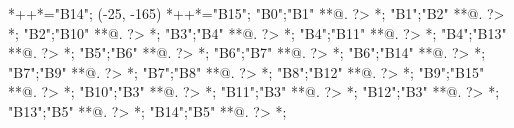 \begin{scriptsize}
	*++{}*\frm{-,}="B14";
(-25, -165)
	*++{}*\frm{-,}="B15";
"B0";"B1" **@{.} ?> *{\dir{>}};
"B1";"B2" **@{.} ?> *{\dir{>}};
"B2";"B10" **@{.} ?> *{\dir{>}};
"B3";"B4" **@{.} ?> *{\dir{>}};
"B4";"B11" **@{.} ?> *{\dir{>}};
"B4";"B13" **@{.} ?> *{\dir{>}};
"B5";"B6" **@{.} ?> *{\dir{>}};
"B6";"B7" **@{.} ?> *{\dir{>}};
"B6";"B14" **@{.} ?> *{\dir{>}};
"B7";"B9" **@{.} ?> *{\dir{>}};
"B7";"B8" **@{.} ?> *{\dir{>}};
"B8";"B12" **@{.} ?> *{\dir{>}};
"B9";"B15" **@{.} ?> *{\dir{>}};
"B10";"B3" **@{.} ?> *{\dir{>}};
"B11";"B3" **@{.} ?> *{\dir{>}};
"B12";"B3" **@{.} ?> *{\dir{>}};
"B13";"B5" **@{.} ?> *{\dir{>}};
"B14";"B5" **@{.} ?> *{\dir{>}};
\endxy
\end{scriptsize}


